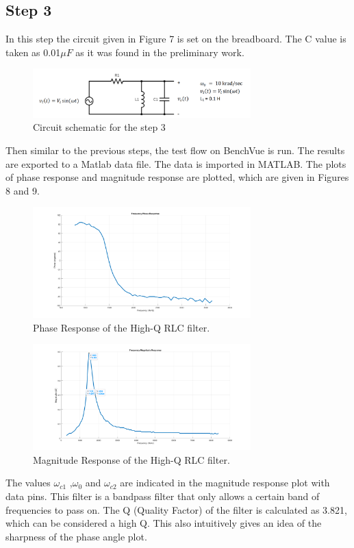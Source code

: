 \documentclass[letterpaper,12pt]{article}
\begin{document}
\subsection{Step 3}
In this step the circuit given in Figure 7 is set on the breadboard. The C value is taken as 0.01\(\mu F\) as it was found in the preliminary work. 
\begin{figure}[H]
    \centering
    \includegraphics[width = 0.75\textwidth]{highqbandpass.png}
    \caption{Circuit schematic for the step 3}
\end{figure} 
Then similar to the previous steps, the test flow on BenchVue is run. The results are exported to a Matlab data file. The data is imported in MATLAB. The plots of phase response and magnitude response are plotted, which are given in Figures 8 and 9.
\begin{figure}[H]
    \centering
    \includegraphics[width = 0.75\textwidth]{3_1_2.png}
    \caption{Phase Response of the High-Q RLC filter.}
\end{figure} 

\begin{figure}[H]
    \centering
    \includegraphics[width = 0.75\textwidth]{3_1_1.png}
    \caption{Magnitude Response of the High-Q RLC filter.}
\end{figure} 
The values \(\omega_{c1}\) ,\(\omega_{0}\) and \(\omega_{c2}\)  are indicated in the magnitude response plot with data pins. This filter is a bandpass filter that only allows a certain band of frequencies to pass on. The Q (Quality Factor) of the filter is calculated as 3.821, which can be considered a high Q. This also intuitively gives an idea of the sharpness of the phase angle plot.  
\end{document}
